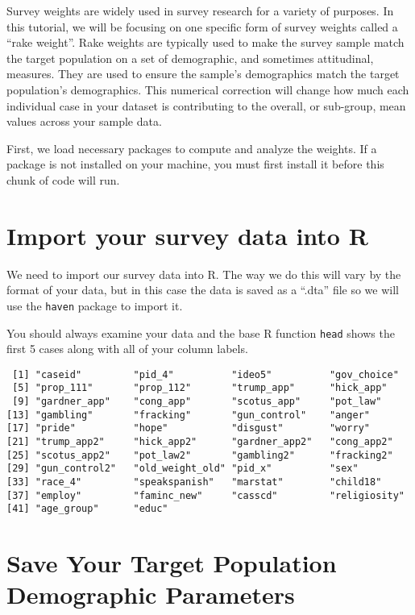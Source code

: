 \documentclass[
  letterpaper,
  DIV=11,
  numbers=noendperiod]{scrreprt}
\begin{document}
Survey weights are widely used in survey research for a variety of
purposes. In this tutorial, we will be focusing on one specific form of
survey weights called a ``rake weight''. Rake weights are typically used
to make the survey sample match the target population on a set of
demographic, and sometimes attitudinal, measures. They are used to
ensure the sample's demographics match the target population's
demographics. This numerical correction will change how much each
individual case in your dataset is contributing to the overall, or
sub-group, mean values across your sample data.

First, we load necessary packages to compute and analyze the weights. If
a package is not installed on your machine, you must first install it
before this chunk of code will run.

\hypertarget{import-your-survey-data-into-r}{%
\section{Import your survey data into
R}\label{import-your-survey-data-into-r}}

We need to import our survey data into R. The way we do this will vary
by the format of your data, but in this case the data is saved as a
``.dta'' file so we will use the \texttt{haven} package to import it.

You should always examine your data and the base R function
\texttt{head} shows the first 5 cases along with all of your column
labels.

\begin{verbatim}
 [1] "caseid"         "pid_4"          "ideo5"          "gov_choice"    
 [5] "prop_111"       "prop_112"       "trump_app"      "hick_app"      
 [9] "gardner_app"    "cong_app"       "scotus_app"     "pot_law"       
[13] "gambling"       "fracking"       "gun_control"    "anger"         
[17] "pride"          "hope"           "disgust"        "worry"         
[21] "trump_app2"     "hick_app2"      "gardner_app2"   "cong_app2"     
[25] "scotus_app2"    "pot_law2"       "gambling2"      "fracking2"     
[29] "gun_control2"   "old_weight_old" "pid_x"          "sex"           
[33] "race_4"         "speakspanish"   "marstat"        "child18"       
[37] "employ"         "faminc_new"     "casscd"         "religiosity"   
[41] "age_group"      "educ"          
\end{verbatim}

\hypertarget{save-your-target-population-demographic-parameters}{%
\section{Save Your Target Population Demographic
Parameters}\label{save-your-target-population-demographic-parameters}}
\end{document}

